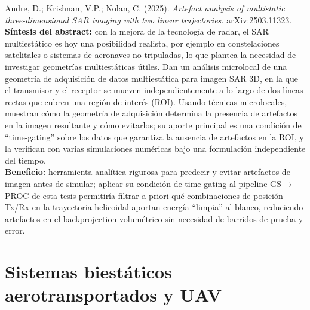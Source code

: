 \documentclass[11pt,a4paper]{article}
\begin{document}
\begin{enumerate}[label=\textbf{[C\arabic*]}, leftmargin=2.2cm, itemsep=10pt]
\item Andre, D.; Krishnan, V.P.; Nolan, C. (2025). \textit{Artefact analysis
of multistatic three-dimensional SAR imaging with two linear
trajectories.} arXiv:2503.11323. \cite{andre2025}\\
\textbf{Síntesis del abstract:} con la mejora de la tecnología de radar, el
SAR multiestático es hoy una posibilidad realista, por ejemplo en
constelaciones satelitales o sistemas de aeronaves no tripuladas, lo que
plantea la necesidad de investigar geometrías multiestáticas útiles. Dan un
análisis microlocal de una geometría de adquisición de datos multiestática
para imagen SAR 3D, en la que el transmisor y el receptor se mueven
independientemente a lo largo de dos líneas rectas que cubren una región de
interés (ROI). Usando técnicas microlocales, muestran cómo la geometría de
adquisición determina la presencia de artefactos en la imagen resultante y
cómo evitarlos; su aporte principal es una condición de ``time-gating''
sobre los datos que garantiza la ausencia de artefactos en la ROI, y la
verifican con varias simulaciones numéricas bajo una formulación
independiente del tiempo.\\
\textbf{Beneficio:} herramienta analítica rigurosa para predecir y evitar
artefactos de imagen antes de simular; aplicar su condición de time-gating
al pipeline GS$\to$PROC de esta tesis permitiría filtrar a priori qué
combinaciones de posición Tx/Rx en la trayectoria helicoidal aportan
energía ``limpia'' al blanco, reduciendo artefactos en el backprojection
volumétrico sin necesidad de barridos de prueba y error.

\end{enumerate}

\section{Sistemas biestáticos aerotransportados y UAV}
\label{sec:uav}
\end{document}
